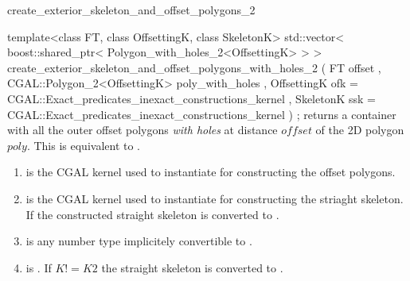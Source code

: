 \begin{ccRefFunction}{create_exterior_skeleton_and_offset_polygons_2}

\ccFunction
{template<class FT, class OffsettingK, class SkeletonK>
std::vector< boost::shared_ptr< Polygon_with_holes_2<OffsettingK> > >
create_exterior_skeleton_and_offset_polygons_with_holes_2 
  ( FT offset
  , CGAL::Polygon_2<OffsettingK> poly_with_holes
  , OffsettingK ofk = CGAL::Exact_predicates_inexact_constructions_kernel
  , SkeletonK ssk   = CGAL::Exact_predicates_inexact_constructions_kernel
  ) ;
}
{returns a container with all the outer offset polygons {\em with holes} at distance $offset$ of the 2D polygon $poly$.
This is equivalent to .}



\begin{enumerate}  
   \item    {} is the CGAL kernel used to instantiate
                             for constructing 
                            the offset polygons.
   \item    {} is the CGAL kernel used to instantiate
                             for constructing 
                            the striaght skeleton.
                            If  the constructed straight skeleton
                            is converted to .
   \item    {} is any number type implicitely convertible to .
   \item    {} is . 
            If $K != K2$ the straight skeleton is converted to .
\end{enumerate}

\ccSeeAlso
{}\\
 \\

\end{ccRefFunction}


